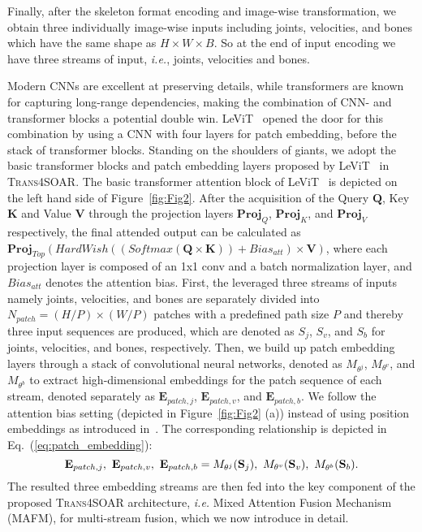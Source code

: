 \documentclass[lettersize,journal]{IEEEtran}
\begin{document}
Finally, after the skeleton format encoding and image-wise transformation, we obtain three individually image-wise inputs including joints, velocities, and bones which have the same shape as $H{\times}W{\times}B$. So at the end of input encoding we have three streams of input, \textit{i.e.}, joints, velocities and bones.

Modern CNNs are excellent at preserving details, while transformers are known for capturing long-range dependencies, making the combination of CNN- and transformer blocks a potential double win.
LeViT~\cite{graham2021levit} opened the door for this combination by using a CNN with four layers for patch embedding, before the stack of transformer blocks.
Standing on the shoulders of giants, we adopt the basic transformer blocks and patch embedding layers proposed by LeViT~\cite{graham2021levit} in \textsc{Trans4SOAR}.
The basic transformer attention block of LeViT~\cite{graham2021levit} is depicted on the left hand side of Figure~\ref{fig:Fig2}.
After the acquisition of the Query $\mathbf{Q}$, Key $\mathbf{K}$ and Value $\mathbf{V}$ through the projection layers $\mathbf{Proj}_{Q}$, $\mathbf{Proj}_{K}$, and $\mathbf{Proj}_{V}$ respectively, the final attended output can be calculated as~ $\mathbf{Proj}_{Top}(HardWish((Softmax(\mathbf{Q}\times\mathbf{K})) + Bias_{att})\times \mathbf{V})$, where each projection layer is composed of an 1x1 conv and a batch normalization layer, and $Bias_{att}$ denotes the attention bias.
First, the leveraged three streams of inputs namely joints, velocities, and bones are separately divided into $N_{patch}{=}(H/P){\times}(W/P)$ patches with a predefined path size $P$ and thereby three input sequences are produced, which are denoted as $S_j$, $S_v$, and $S_b$ for joints, velocities, and bones, respectively.
Then, we build up patch embedding layers through a stack of convolutional neural networks, denoted as $M_{\theta^j}$, $M_{\theta^v}$, and $M_{\theta^b}$ to extract high-dimensional embeddings for the patch sequence of each stream, denoted separately as $\textbf{E}_{patch,j}$, $\textbf{E}_{patch,v}$, and $\textbf{E}_{patch,b}$. We follow the attention bias setting (depicted in Figure~\ref{fig:Fig2} (a)) instead of using position embeddings as introduced in~\cite{graham2021levit}.
The corresponding relationship is depicted in Eq.~(\ref{eq:patch_embedding}):
\begin{equation}\label{eq:patch_embedding}
\centering
\mathbf{E}_{patch,j},~ \mathbf{E}_{patch,v},~ \mathbf{E}_{patch,b} = M_{\theta^j}(\textbf{S}_j),~M_{\theta^v}(\textbf{S}_v),~M_{\theta^b}(\textbf{S}_b).
\end{equation}
The resulted three embedding streams are then fed into the key component of the proposed \textsc{Trans4SOAR} architecture, \textit{i.e.} Mixed Attention Fusion Mechanism (MAFM), for multi-stream fusion, which we now introduce in detail.
\end{document}
